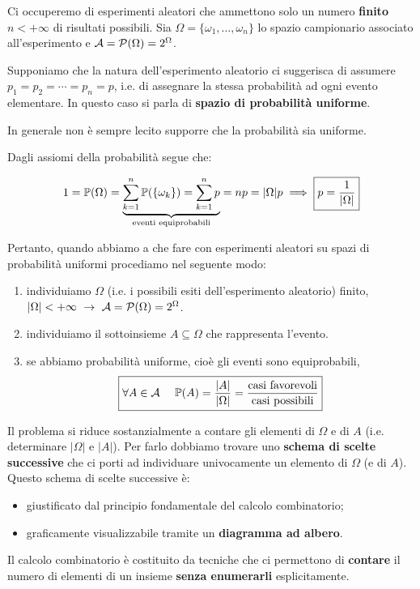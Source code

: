 
\ParteEsercizi

Ci occuperemo di esperimenti aleatori che ammettono solo un numero \textbf{finito} $n< +\infty $ di risultati possibili. Sia $\Omega =\{\omega_{1} ,\dots ,\omega_{n}\}$ lo spazio campionario associato all'esperimento e $\mathcal{A} =\mathcal{P}(\Omega) =2^{\Omega }$.

Supponiamo che la natura dell'esperimento aleatorio ci suggerisca di assumere $p_{1} =p_{2} =\cdots =p_{n} =p$, i.e. di assegnare la stessa probabilità ad ogni evento elementare. In questo caso si parla di \textbf{spazio di probabilità uniforme}.

\begin{oss}
	In generale non è sempre lecito supporre che la probabilità sia uniforme.
\end{oss}

Dagli assiomi della probabilità segue che:

\begin{equation*}
	1=\mathbb{P}(\Omega) =\underbrace{\sum\limits_{k=1}^{n}\mathbb{P}(\{\omega_{k}\}) =\sum\limits_{k=1}^{n} p}_{\text{eventi equiprobabili}} =np=| \Omega | p\implies \boxed{p=\frac{1}{| \Omega | }}
\end{equation*}

Pertanto, quando abbiamo a che fare con esperimenti aleatori su spazi di probabilità uniformi procediamo nel seguente modo:
\begin{enumerate}
	\item individuiamo $\Omega $ (i.e. i possibili esiti dell'esperimento aleatorio) finito, $| \Omega | < +\infty \ \rightarrow \ \mathcal{A} =\mathcal{P}(\Omega) =2^{\Omega }$.
	\item individuiamo il sottoinsieme $A\subseteq \Omega $ che rappresenta l'evento.
	\item se abbiamo probabilità uniforme, cioè gli eventi sono equiprobabili,
	\begin{equation*}
		\boxed{\forall A\in \Ac \ \ \ \ \PP(A) =\frac{| A| }{| \Omega | } =\frac{\text{casi favorevoli}}{\text{casi possibili}}}
	\end{equation*}
\end{enumerate}
Il problema si riduce sostanzialmente a contare gli elementi di $\Omega $ e di $A$ (i.e. determinare $| \Omega | $ e $|A| $). Per farlo dobbiamo trovare uno \textbf{schema di scelte successive} che ci porti ad individuare univocamente un elemento di $\Omega $ (e di $A$). Questo schema di scelte successive è:
\begin{itemize}
	\item giustificato dal principio fondamentale del calcolo combinatorio;
	\item graficamente visualizzabile tramite un \textbf{diagramma ad albero}.
\end{itemize}
Il calcolo combinatorio è costituito da tecniche che ci permettono di \textbf{contare} il numero di elementi di un insieme \textbf{senza enumerarli} esplicitamente.

